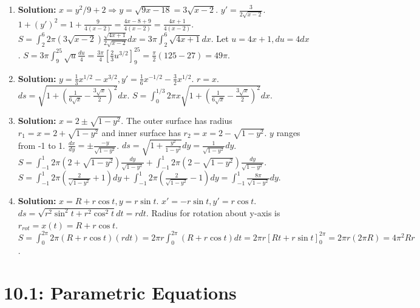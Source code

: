 \documentclass{article}
\begin{document}
\begin{enumerate}
\item \textbf{Solution:} $x = y^2/9+2 \Rightarrow y=\sqrt{9x-18}=3\sqrt{x-2}$. $y'=\frac{3}{2\sqrt{x-2}}$. $1+(y')^2=1+\frac{9}{4(x-2)}=\frac{4x-8+9}{4(x-2)}=\frac{4x+1}{4(x-2)}$.
$S=\int_2^6 2\pi (3\sqrt{x-2})\frac{\sqrt{4x+1}}{2\sqrt{x-2}}dx = 3\pi\int_2^6 \sqrt{4x+1}dx$.
Let $u=4x+1, du=4dx$. $S=3\pi\int_9^{25} \sqrt{u}\frac{du}{4} = \frac{3\pi}{4}[\frac{2}{3}u^{3/2}]_9^{25} = \frac{\pi}{2}(125-27)=49\pi$.

\item \textbf{Solution:} $y = \frac{1}{3}x^{1/2} - x^{3/2}, y'=\frac{1}{6}x^{-1/2}-\frac{3}{2}x^{1/2}$. $r=x$.
$ds=\sqrt{1+(\frac{1}{6\sqrt{x}}-\frac{3\sqrt{x}}{2})^2}dx$.
$S=\int_0^{1/3} 2\pi x \sqrt{1+(\frac{1}{6\sqrt{x}}-\frac{3\sqrt{x}}{2})^2} dx$.

\item \textbf{Solution:} $x=2\pm\sqrt{1-y^2}$. The outer surface has radius $r_1=x=2+\sqrt{1-y^2}$ and inner surface has $r_2=x=2-\sqrt{1-y^2}$. $y$ ranges from -1 to 1.
$\frac{dx}{dy}=\pm\frac{-y}{\sqrt{1-y^2}}$. $ds=\sqrt{1+\frac{y^2}{1-y^2}}dy = \frac{1}{\sqrt{1-y^2}}dy$.
$S = \int_{-1}^1 2\pi(2+\sqrt{1-y^2})\frac{dy}{\sqrt{1-y^2}} + \int_{-1}^1 2\pi(2-\sqrt{1-y^2})\frac{dy}{\sqrt{1-y^2}}$.
$S = \int_{-1}^1 2\pi(\frac{2}{\sqrt{1-y^2}}+1)dy + \int_{-1}^1 2\pi(\frac{2}{\sqrt{1-y^2}}-1)dy = \int_{-1}^1 \frac{8\pi}{\sqrt{1-y^2}}dy$.

\item \textbf{Solution:} $x=R+r\cos t, y=r\sin t$. $x'=-r\sin t, y'=r\cos t$. $ds=\sqrt{r^2\sin^2t+r^2\cos^2t}dt = r dt$.
Radius for rotation about y-axis is $r_{rot}=x(t)=R+r\cos t$.
$S=\int_0^{2\pi} 2\pi(R+r\cos t)(r dt) = 2\pi r \int_0^{2\pi}(R+r\cos t)dt = 2\pi r [Rt+r\sin t]_0^{2\pi} = 2\pi r(2\pi R) = 4\pi^2Rr$.

\end{enumerate}

\part*{10.1: Parametric Equations}
\end{document}
